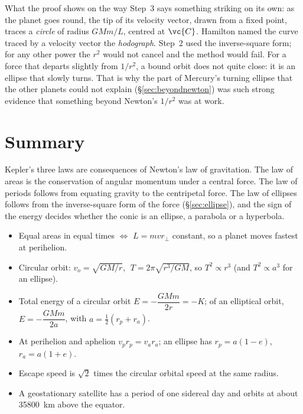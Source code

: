 \begin{remarkbox}{What the proof shows on the way}
Step~3 says something striking on its own: as the planet goes round, the tip of its velocity vector,
drawn from a fixed point, traces a \emph{circle} of radius $GMm/L$, centred at $\vc{C}$. Hamilton named
the curve traced by a velocity vector the \emph{hodograph}. Step~2 used the inverse-square form; for any
other power the $r^2$ would not cancel and the method would fail. For a force that departs slightly from
$1/r^2$, a bound orbit does not quite close: it is an ellipse that slowly turns. That is why the part of
Mercury's turning ellipse that the other planets could not explain (\S\ref{sec:beyondnewton}) was such
strong evidence that something beyond Newton's $1/r^2$ was at work.
\end{remarkbox}

\section{Summary}\label{sec:summary17}
Kepler's three laws are consequences of Newton's law of gravitation. The law of areas is the conservation of
angular momentum under a central force. The law of periods follows from equating gravity to the centripetal
force. The law of ellipses follows from the inverse-square form of the force (\S\ref{sec:ellipse}), and
the sign of the energy decides whether the conic is an ellipse, a parabola or a hyperbola.

\begin{itemize}
\item Equal areas in equal times $\Leftrightarrow$ $L=mvr_\perp$ constant, so a planet moves fastest at
      perihelion.
\item Circular orbit: $v_o=\sqrt{GM/r}$, $\;T=2\pi\sqrt{r^3/GM}$, so $T^2\propto r^3$ (and
      $T^2\propto a^3$ for an ellipse).
\item Total energy of a circular orbit $E=-\dfrac{GMm}{2r}=-K$; of an elliptical orbit,
      $E=-\dfrac{GMm}{2a}$, with $a=\tfrac12(r_p+r_a)$.
\item At perihelion and aphelion $v_pr_p=v_ar_a$; an ellipse has $r_p=a(1-e)$, $r_a=a(1+e)$.
\item Escape speed is $\sqrt2$ times the circular orbital speed at the same radius.
\item A geostationary satellite has a period of one sidereal day and orbits at about \SI{35800}{km} above the
      equator.
\end{itemize}

